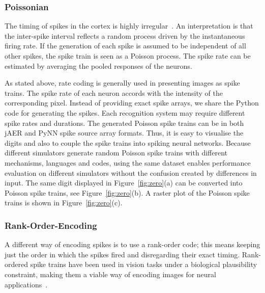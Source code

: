 \subsubsection{Poissonian}
\label{sec:poissonian}
The timing of spikes in the cortex is highly irregular~\cite{squire1998findings}.
An interpretation is that the inter-spike interval reflects a random process driven by the instantaneous firing rate.
If the generation of each spike is assumed to be independent of all other spikes, the spike train is seen as a Poisson process.
The spike rate can be estimated by averaging the pooled responses of the neurons.

As stated above, rate coding is generally used in presenting images as spike trains.
The spike rate of each neuron accords with the intensity of the corresponding pixel.
Instead of providing exact spike arrays, we share the Python code for generating the spikes.
Each recognition system may require different spike rates and durations.
The generated Poisson spike trains can be in both jAER and PyNN spike source array formats.
Thus, it is easy to visualise the digits and also to couple the spike trains into spiking neural networks.
Because different simulators generate random Poisson spike trains with different mechanisms, languages and codes, using the same dataset enables performance evaluation on different simulators without the confusion created by differences in input.
The same digit displayed in Figure~\ref{fig:zero}(a) can be converted into Poisson spike trains, see Figure~\ref{fig:zero}(b).
A raster plot of the Poisson spike trains is shown in Figure~\ref{fig:zero}(c).



\subsubsection{Rank-Order-Encoding}
A different way of encoding spikes is to use a rank-order code; this means
keeping just the order in which the spikes fired and disregarding their exact timing. Rank-ordered spike trains have been used in vision tasks under a biological plausibility constraint, making them a viable way of encoding images for neural applications~\cite{van2001rate,sen2009evaluating,masmoudi2010novel}.

